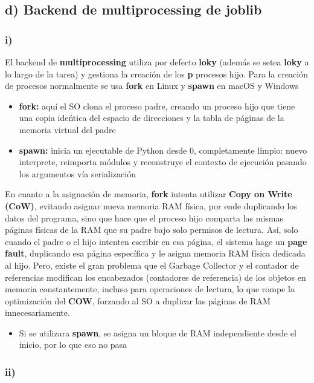 \documentclass[11pt]{article}
\begin{document}
\subsection*{d) Backend de multiprocessing de joblib}

\subsubsection*{i)}

El backend de \textbf{multiprocessing} utiliza por defecto \textbf{loky} (adem\'as se setea \textbf{loky} a lo largo de la tarea) y gestiona la creaci\'on de los \textbf{p} procesos hijo. Para la creaci\'on de procesos normalmente se usa \textbf{fork} en Linux y \textbf{spawn} en macOS y Windows
\begin{itemize}
  \item \textbf{fork:} aqu\'i el SO clona el proceso padre, creando un proceso hijo que tiene una copia ide\'ntica del espacio de direcciones y la tabla de p\'aginas de la memoria virtual del padre
  \item \textbf{spawn:} inicia un ejecutable de Python desde 0, completamente limpio: nuevo interprete, reimporta m\'odulos y reconstruye el contexto de ejecuci\'on pasando los argumentos v\'ia serializaci\'on
\end{itemize}

En cuanto a la asignaci\'on de memoria, \textbf{fork} intenta utilizar \textbf{Copy on Write (CoW)}, evitando asignar nueva memoria RAM f\'isica, por ende duplicando los datos del programa, sino que hace que el proceso hijo comparta las mismas p\'aginas f\'isicas de la RAM que su padre bajo solo permisos de lectura. As\'i, solo cuando el padre o el hijo intenten escribir en esa p\'agina, el sistema hage un \textbf{page fault}, duplicando esa p\'agina espec\'ifica y le asigna memoria RAM f\'isica dedicada al hijo. Pero, existe el gran problema que el Garbage Collector y el contador de referencias modifican los encabezados (contadores de referencia) de los objetos en memoria constantemente, incluso para operaciones de lectura, lo que rompe la optimizaci\'on del \textbf{COW}, forzando al SO a duplicar las p\'aginas de RAM innecesariamente.
\begin{itemize}
  \item Si se utilizara \textbf{spawn}, se asigna un bloque de RAM independiente desde el inicio, por lo que eso no pasa
\end{itemize}

\subsubsection*{ii)}
\end{document}
